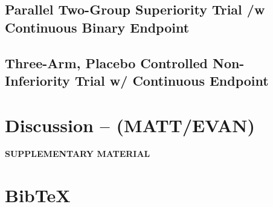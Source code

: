 \documentclass[12pt]{article}
\begin{document}
\subsection{Parallel Two-Group Superiority Trial /w Continuous Binary Endpoint}

\subsection{Three-Arm, Placebo Controlled Non-Inferiority Trial w/ Continuous Endpoint}

\section{Discussion -- (MATT/EVAN)}

%
%
%
%
%				
%
%


%
			
	

\newpage
\begin{center}
{\large\bf SUPPLEMENTARY MATERIAL}
\end{center}


\section{BibTeX}

 
 		
\end{document}
